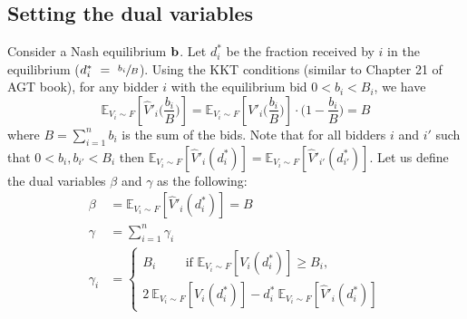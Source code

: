 \subsection{Setting the dual variables}

Consider a Nash equilibrium $\mathbf{b}$. Let $d_{i}^*$ be the fraction received by $i$ in the equilibrium ($d^{*}_{i}~=~\sfrac{b_{i}}{B}$).
Using the KKT conditions (similar to Chapter 21 of AGT book), for any bidder $i$ with the equilibrium bid $0 < b_{i} < B_{i}$, we have
$$
\mathbb{E}_{V_i \sim F}\left[\hat{V}'_{i}\biggl( \frac{b_{i}}{B} \biggr)\right]
=  \mathbb{E}_{V_i \sim F}\left[V'_{i}\biggl( \frac{b_{i}}{B} \biggr)\right] \cdot \biggl( 1 - \frac{b_{i}}{B} \biggr)
= B
$$
where $B = \sum_{i=1}^{n} b_{i}$ is the sum of the bids.
Note that for all bidders $i$ and $i'$ such that $0 < b_{i}, b_{i'} < B_{i}$ then
$  \mathbb{E}_{V_i \sim F}[\hat{V}'_{i}(d^{*}_{i})]  =  \mathbb{E}_{V_i \sim F}[\hat{V}'_{i'}(d_{i'}^*)]$.
%
Let us define the dual variables $\beta$ and $\gamma$ as the following:
\begin{align*}
	\beta &=  \mathbb{E}_{V_i \sim F}[\hat{V}'_{i}(d^{*}_{i})] = B\\
	\gamma &= \sum_{i=1}^{n} \gamma_{i}\\
\gamma_{i} &= \begin{cases}
	B_{i} \qquad \text{ if }  \mathbb{E}_{V_i \sim F}[V_{i}(d^{*}_{i})] \geq B_{i}, \\
	2 \ \mathbb{E}_{V_i \sim F}[V_{i}(d^{*}_{i})] - d^{*}_{i} \ \mathbb{E}_{V_i \sim F}[\hat{V}'_{i}(d^{*}_{i})]
\end{cases}
\end{align*}

